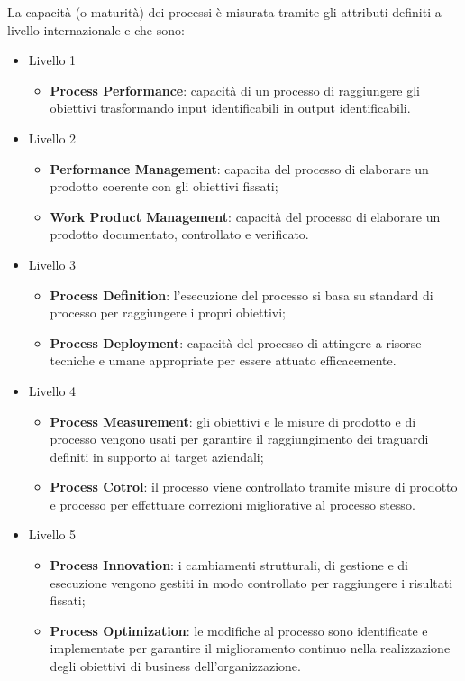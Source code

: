 La capacità (o maturità) dei processi è misurata tramite gli attributi definiti a livello internazionale e che sono:
\begin{itemize}
	\item Livello 1
	\begin{itemize}
		\item \textbf{Process Performance}: capacità di un processo di raggiungere gli obiettivi trasformando input identificabili in output identificabili.
	\end{itemize}
	\item Livello 2
	\begin{itemize}
		\item \textbf{Performance Management}: capacita del processo di elaborare un
		prodotto coerente con gli obiettivi fissati;
		\item \textbf{Work Product Management}: capacità del processo di elaborare un prodotto documentato, controllato e verificato.
	\end{itemize}
	\item Livello 3
	\begin{itemize}
		\item \textbf{Process Definition}: l'esecuzione del processo si basa su standard di
		processo per raggiungere i propri obiettivi;
		\item \textbf{Process Deployment}: capacità del processo di attingere a risorse tecniche e umane appropriate per essere attuato efficacemente.
	\end{itemize}
	\item Livello 4
	\begin{itemize}
		\item \textbf{Process Measurement}: gli obiettivi e le misure di prodotto e di processo vengono usati per garantire il raggiungimento dei traguardi definiti in supporto ai target aziendali;
		\item \textbf{Process Cotrol}: il processo viene controllato tramite misure di prodotto e processo per effettuare correzioni migliorative al processo stesso.
	\end{itemize}
	\item Livello 5
	\begin{itemize}
		\item \textbf{Process Innovation}: i cambiamenti strutturali, di gestione e di esecuzione vengono gestiti in modo controllato per raggiungere i risultati fissati;
		\item \textbf{Process Optimization}: le modifiche al processo sono identificate e implementate per garantire il miglioramento continuo nella realizzazione degli obiettivi di business dell'organizzazione.
	\end{itemize}
\end{itemize}
